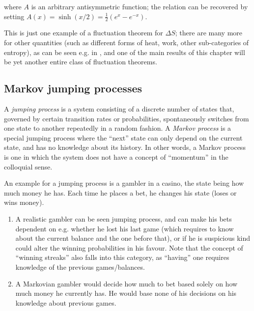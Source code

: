 %
where \(A\) is an arbitrary antisymmetric function; the relation  can be recovered by setting \(A(x) = \sinh(x/2) = \frac12(e^x-e^{-x})\).

This is just one example of a fluctuation theorem for \(\Delta S\); there are many more for other quantities (such as different forms of heat, work, other sub-categories of entropy), as can be seen e.g. in \cite{seifert-review}, and one of the main results of this chapter will be yet another entire class of fluctuation theorems.


\subsection{Markov jumping processes}
\label{sec:markov process}

A \emph{jumping process} is a system consisting of a discrete number of states that, governed by certain transition rates or probabilities, spontaneously switches from one state to another repeatedly in a random fashion. A \emph{Markov process} is a special jumping process where the ``next'' state can only depend on the current state, and has no knowledge about its history. In other words, a Markov process is one in which the system does not have a concept of ``momentum'' in the colloquial sense.

An example for a jumping process is a gambler in a casino, the state being how much money he has. Each time he places a bet, he changes his state (loses or wins money).
%
\begin{enumerate}
	\item A realistic gambler can be seen jumping process, and can make his bets dependent on e.g. whether he lost his last game (which requires to know about the current balance and the one before that), or if he is suspicious kind could alter the winning probabilities in his favour. Note that the concept of ``winning streaks'' also falls into this category, as ``having'' one requires knowledge of the previous games/balances.
	\item A Markovian gambler would decide how much to bet based solely on how much money he currently has. He would base none of his decisions on his knowledge about previous games.
\end{enumerate}






